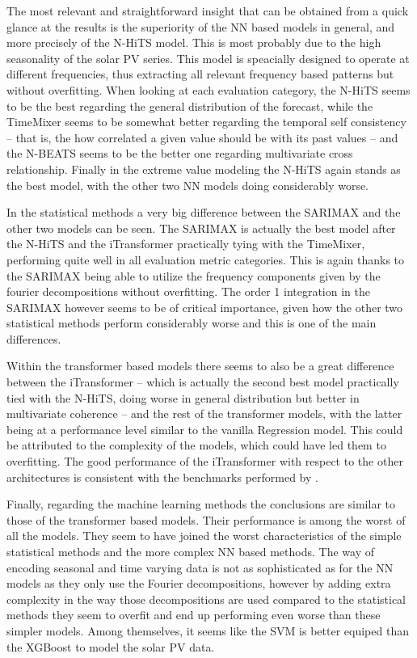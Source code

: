 The most relevant and straightforward insight that can be obtained from a quick glance at the results is the superiority of the NN based models in general, and more precisely of the N-HiTS model. This is most probably due to the high seasonality of the solar PV series. This model is speacially designed to operate at different frequencies, thus extracting all relevant frequency based patterns but without overfitting. When looking at each evaluation category, the N-HiTS seems to be the best regarding the general distribution of the forecast, while the TimeMixer seems to be somewhat better regarding the temporal self consistency -- that is, the how correlated a given value should be with its past values -- and the N-BEATS seems to be the better one regarding multivariate cross relationship. Finally in the extreme value modeling the N-HiTS again stands as the best model, with the other two NN models doing considerably worse. 

In the statistical methods a very big difference between the SARIMAX and the other two models can be seen. The SARIMAX is actually the best model after the N-HiTS and the iTransformer practically tying with the TimeMixer, performing quite well in all evaluation metric categories. This is again thanks to the SARIMAX being able to utilize the frequency components given by the fourier decompositions without overfitting. The order 1 integration in the SARIMAX however seems to be of critical importance, given how the other two statistical methods perform considerably worse and this is one of the main differences. 

Within the transformer based models there seems to also be a great difference between the iTransformer -- which is actually the second best model practically tied with the N-HiTS, doing worse in general distribution but better in multivariate coherence -- and the rest of the transformer models, with the latter being at a performance level similar to the vanilla Regression model. This could be attributed to the complexity of the models, which could have led them to overfitting. The good performance of the iTransformer with respect to the other architectures is consistent with the benchmarks performed by \cite{wang2024tssurvey}.  

Finally, regarding the machine learning methods the conclusions are similar to those of the transformer based models. Their performance is among the worst of all the models. They seem to have joined the worst characteristics of the simple statistical methods and the more complex NN based methods. The way of encoding seasonal and time varying data is not as sophisticated as for the NN models as they only use the Fourier decompositions, however by adding extra complexity in the way those decompositions are used compared to the statistical methods they seem to overfit and end up performing even worse than these simpler models. Among themselves, it seems like the SVM is better equiped than the XGBoost to model the solar PV data.

